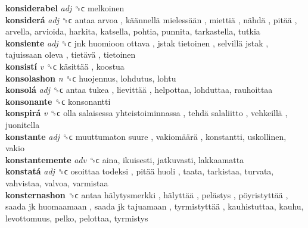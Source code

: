 \textbf{konsiderabel} \emph{adj}  ␝ϲ  melkoinen  \\
\textbf{konsiderá} \emph{adj}  ␝ϲ   antaa arvoa ,  käännellä mielessään ,  miettiä ,  nähdä ,  pitää , arvella, arvioida, harkita, katsella, pohtia, punnita, tarkastella, tutkia  \\
\textbf{konsiente} \emph{adj}  ␝ϲ   jnk huomioon ottava ,  jstak tietoinen ,  selvillä jstak ,  tajuissaan oleva ,  tietävä , tietoinen  \\
\textbf{konsistí} \emph{v}  ␝ϲ   käsittää , koostua  \\
\textbf{konsolashon} \emph{n}  ␝ϲ  huojennus, lohdutus, lohtu  \\
\textbf{konsolá} \emph{adj}  ␝ϲ   antaa tukea ,  lievittää , helpottaa, lohduttaa, rauhoittaa  \\
\textbf{konsonante} ␝ϲ  konsonantti  \\
\textbf{konspirá} \emph{v}  ␝ϲ   olla salaisessa yhteistoiminnassa ,  tehdä salaliitto ,  vehkeillä , juonitella  \\
\textbf{konstante} \emph{adj}  ␝ϲ   muuttumaton suure ,  vakiomäärä , konstantti, uskollinen, vakio  \\
\textbf{konstantemente} \emph{adv}  ␝ϲ  aina, ikuisesti, jatkuvasti, lakkaamatta  \\
\textbf{konstatá} \emph{adj}  ␝ϲ   osoittaa todeksi ,  pitää huoli , taata, tarkistaa, turvata, vahvistaa, valvoa, varmistaa  \\
\textbf{konsternashon} ␝ϲ   antaa hälytysmerkki ,  hälyttää ,  pelästys ,  pöyristyttää ,  saada jk huomaamaan ,  saada jk tajuamaan ,  tyrmistyttää , kauhistuttaa, kauhu, levottomuus, pelko, pelottaa, tyrmistys  \\
